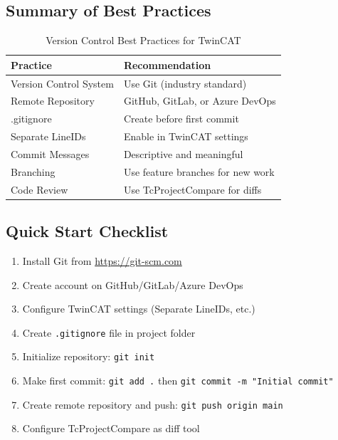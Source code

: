 \documentclass[11pt,a4paper]{article}
\begin{document}
\subsection{Summary of Best Practices}

\begin{table}[h]
\centering
\begin{tabular}{@{}ll@{}}
\toprule
\textbf{Practice} & \textbf{Recommendation} \\
\midrule
Version Control System & Use Git (industry standard) \\
Remote Repository & GitHub, GitLab, or Azure DevOps \\
.gitignore & Create before first commit \\
Separate LineIDs & Enable in TwinCAT settings \\
Commit Messages & Descriptive and meaningful \\
Branching & Use feature branches for new work \\
Code Review & Use TcProjectCompare for diffs \\
\bottomrule
\end{tabular}
\caption{Version Control Best Practices for TwinCAT}
\end{table}

\subsection{Quick Start Checklist}

\begin{enumerate}[leftmargin=*]
    \item Install Git from \url{https://git-scm.com}
    \item Create account on GitHub/GitLab/Azure DevOps
    \item Configure TwinCAT settings (Separate LineIDs, etc.)
    \item Create \texttt{.gitignore} file in project folder
    \item Initialize repository: \texttt{git init}
    \item Make first commit: \texttt{git add .} then \texttt{git commit -m "Initial commit"}
    \item Create remote repository and push: \texttt{git push origin main}
    \item Configure TcProjectCompare as diff tool
\end{enumerate}

\end{document}
